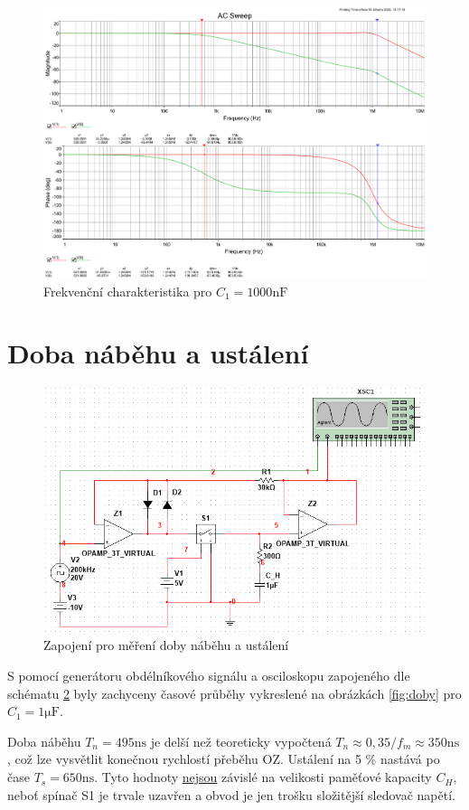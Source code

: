 \documentclass[twoside]{article}
\begin{document}
\begin{figure}[h!]
    \centering
    \includegraphics[width=0.92\linewidth]{bode_1000.pdf}
    \caption{Frekvenční charakteristika pro $C_1 = 1000 \si{\nano\farad}$}
    \label{fig:bode_1000}
\end{figure}

\newpage
\section{Doba náběhu a ustálení}
\label{sec:rise}
\begin{figure}[h!]
    \centering
    \includegraphics[width=0.7\linewidth]{rise_time_schema.png}
    \caption{Zapojení pro měření doby náběhu a ustálení}
    \label{fig:rise_schema}
\end{figure}

S pomocí generátoru obdélníkového signálu a osciloskopu zapojeného dle schématu \ref{fig:rise_schema}
byly zachyceny časové průběhy vykreslené na obrázkách \ref{fig:doby} pro $C_1 = 1 \si{\micro\farad}$.

Doba náběhu $T_n = 495 \si{\nano\second}$ je delší než teoreticky vypočtená $T_n \approx 0,35/f_m \approx 350 \si{\nano\second}$,
což lze vysvětlit konečnou rychlostí přeběhu OZ. Ustálení na 5 \% nastává po čase $T_s = 650 \si{\nano\second}$.
Tyto hodnoty \underline{nejsou} závislé na velikosti paměťové kapacity $C_H$, neboť spínač S1 je trvale uzavřen
a obvod je jen trošku složitější sledovač napětí.
\end{document}
